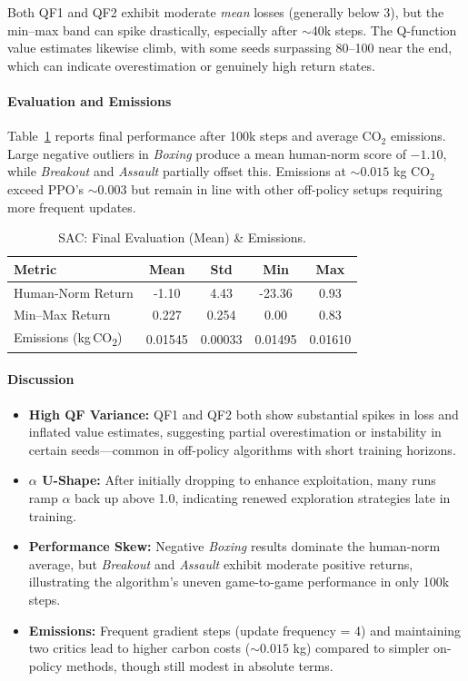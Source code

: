 \noindent
Both QF1 and QF2 exhibit moderate \emph{mean} losses (generally below 3), but the min--max band can spike drastically, especially after \(\sim\)40k steps. The Q-function value estimates likewise climb, with some seeds surpassing 80–100 near the end, which can indicate overestimation or genuinely high return states.

\paragraph{Evaluation and Emissions}
Table~\ref{tab:sac_eval} reports final performance after 100k steps and average CO\(_2\) emissions. Large negative outliers in \emph{Boxing} produce a mean human‐norm score of \(-1.10\), while \emph{Breakout} and \emph{Assault} partially offset this. Emissions at \(\sim0.015\) kg CO\(_2\) exceed PPO’s \(\sim0.003\) but remain in line with other off-policy setups requiring more frequent updates.

\begin{table}[htbp]
	\centering
	\caption{SAC: Final Evaluation (Mean) \& Emissions.}
	\label{tab:sac_eval}
	\begin{tabular}{lcccc}
		\toprule
		\textbf{Metric} & \textbf{Mean} & \textbf{Std} & \textbf{Min} & \textbf{Max} \\
		\midrule
		Human‐Norm Return & -1.10 & 4.43 & -23.36 & 0.93 \\
		Min--Max Return   & 0.227 & 0.254 & 0.00   & 0.83 \\
		Emissions (kg\,CO\textsubscript{2}) & 0.01545 & 0.00033 & 0.01495 & 0.01610 \\
		\bottomrule
	\end{tabular}
\end{table}

\paragraph{Discussion}
\begin{itemize}
	\item \textbf{High QF Variance:}
	QF1 and QF2 both show substantial spikes in loss and inflated value estimates, suggesting partial overestimation or instability in certain seeds—common in off-policy algorithms with short training horizons.
	\item \textbf{\(\alpha\) U-Shape:}
	After initially dropping to enhance exploitation, many runs ramp \(\alpha\) back up above 1.0, indicating renewed exploration strategies late in training.
	\item \textbf{Performance Skew:}
	Negative \emph{Boxing} results dominate the human‐norm average, but \emph{Breakout} and \emph{Assault} exhibit moderate positive returns, illustrating the algorithm’s uneven game-to-game performance in only 100k steps.
	\item \textbf{Emissions:}
	Frequent gradient steps (update frequency = 4) and maintaining two critics lead to higher carbon costs (\(\sim0.015\) kg) compared to simpler on-policy methods, though still modest in absolute terms.
\end{itemize}

